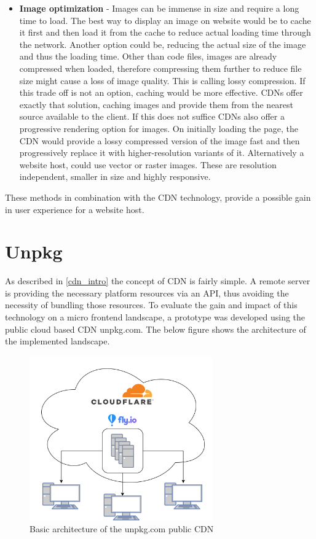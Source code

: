 \begin{itemize}
	\item \textbf{Image optimization} - Images can be immense in size and require a long time to load. The best way to display an image on website would be to cache it first and then load it from the cache to reduce actual loading time through the network. Another option could be, reducing the actual size of the image and thus the loading time.
	Other than code files, images are already compressed when loaded, therefore compressing them further to reduce file size might cause a loss of image quality. This is calling lossy compression. If this trade off is not an option, caching would be more effective.
	CDNs offer exactly that solution, caching images and provide them from the nearest source available to the client. If this does not suffice CDNs also offer a progressive rendering option for images. On initially loading the page, the CDN would provide a lossy compressed version of the image fast and then progressively replace it with higher-resolution variants of it.
	Alternatively a website host, could use vector or raster images. These are resolution independent, smaller in size and highly responsive.  
\end{itemize}

These methods in combination with the CDN technology, provide a possible gain in user experience for a website host. \cite{cdn_fe_opt}
\section{Unpkg}

As described in \ref{cdn_intro} the concept of CDN is fairly simple. A remote server is providing the necessary platform resources via an API, thus avoiding the necessity of bundling those resources.
To evaluate the gain and impact of this technology on a micro frontend landscape, a prototype was developed using the public cloud based CDN unpkg.com.
The below figure shows the architecture of the implemented landscape. 

\begin{figure}[!h]
	\centering
	\includegraphics[width=0.7\textwidth]{Figures/cdn_unpkg.drawio.png}
	\caption{Basic architecture of the unpkg.com public CDN}
	\label{fig:unpkg_architecture}
\end{figure}

